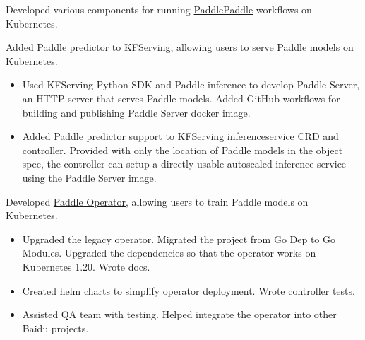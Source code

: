 
Developed various components for running \href{https://github.com/PaddlePaddle}{PaddlePaddle} workflows on Kubernetes.

\begin{miniItemize}
    \item Added Paddle predictor to \href{https://github.com/kubeflow/kfserving}{KFServing}, allowing users to serve Paddle models on Kubernetes.
    \begin{itemize}[after=\vspace{0ex}]
        \item Used KFServing Python SDK and Paddle inference to develop Paddle Server, an HTTP server that serves Paddle models. Added GitHub workflows for building and publishing Paddle Server docker image.
        \item Added Paddle predictor support to KFServing inferenceservice CRD and controller. Provided with only the location of Paddle models in the object spec, the controller can setup a directly usable autoscaled inference service using the Paddle Server image.
    \end{itemize}
    \item Developed \href{https://github.com/PaddleFlow/paddle-operator}{Paddle Operator}, allowing users to train Paddle models on Kubernetes.
    \begin{itemize}[after=\vspace{0ex}]
        \item Upgraded the legacy operator. Migrated the project from Go Dep to Go Modules. Upgraded the dependencies so that the operator works on Kubernetes 1.20. Wrote docs.
        \item Created helm charts to simplify operator deployment. Wrote controller tests.
        \item Assisted QA team with testing. Helped integrate the operator into other Baidu projects.
    \end{itemize}
\end{miniItemize}
